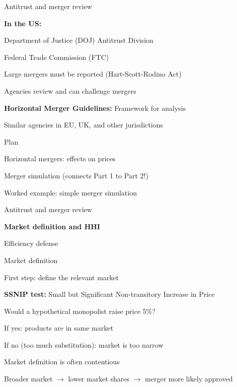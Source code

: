 \documentclass[notes,11pt, aspectratio=169]{beamer}
\newenvironment{wideitemize}{\itemize\addtolength{\itemsep}{10pt}}{\enditemize}
\newenvironment{wideenumerate}{\enumerate\addtolength{\itemsep}{10pt}}{\endenumerate}
\begin{document}
\begin{frame}{Antitrust and merger review}
	\begin{wideitemize}
		\item \textbf{In the US:}
		\begin{wideitemize}
			\vspace{5pt}
			\item Department of Justice (DOJ) Antitrust Division
			\item Federal Trade Commission (FTC)
		\end{wideitemize}
		\item Large mergers must be reported (Hart-Scott-Rodino Act)
		\item Agencies review and can challenge mergers
		\item \textbf{Horizontal Merger Guidelines:} Framework for analysis
		\item Similar agencies in EU, UK, and other jurisdictions
	\end{wideitemize}
\end{frame}

\begin{frame}{Plan}
  \begin{wideenumerate}
    \item Horizontal mergers: effects on prices
    \item Merger simulation (connects Part 1 to Part 2!)
    \item Worked example: simple merger simulation
    \item Antitrust and merger review
    \item \textbf{Market definition and HHI}
    \item Efficiency defense
  \end{wideenumerate}
\end{frame}

\begin{frame}{Market definition}
	\begin{wideitemize}
		\item First step: define the relevant market
		\item \textbf{SSNIP test:} Small but Significant Non-transitory Increase in Price
		\begin{wideitemize}
			\vspace{5pt}
			\item Would a hypothetical monopolist raise price 5\%?
			\item If yes: products are in same market
			\item If no (too much substitution): market is too narrow
		\end{wideitemize}
		\item Market definition is often contentious
		\item Broader market $\rightarrow$ lower market shares $\rightarrow$ merger more likely approved
	\end{wideitemize}
\end{frame}
\end{document}
